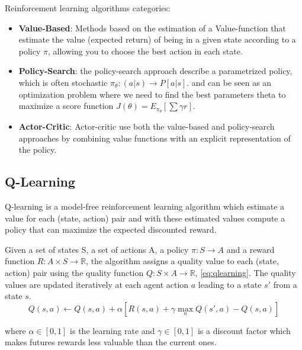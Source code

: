 \noindent
Reinforcement learning algorithms categories:
\begin{itemize}
    \item \textbf{Value-Based}: Methods based on the estimation of a Value-function that estimate the value (expected return) of being in a given state according to a policy $\pi$,
    allowing you to choose the best action in each state.

    \item \textbf{Policy-Search}: the policy-search approach describe a parametrized policy, which is often stochastic $\pi_{\theta} : (a | s) \rightarrow P[a | s]$.
    and can be seen as an optimization problem where we need to find the best parameters theta to maximize
    a score function $J(\theta) = E_{\pi_\theta}[\sum \gamma r]$.
    
    \item \textbf{Actor-Critic}: Actor-critic use both the value-based and policy-search approaches by combining value
    functions with an explicit representation of the policy.
\end{itemize}

\subsection{Q-Learning}
Q-learning \cite{watkins1992q} is a model-free reinforcement learning algorithm which estimate a value for each (state, action) pair
and with these estimated values compute a policy that can maximize the expected discounted reward.

Given a set of states S, a set of actions A, a policy $\pi : S \rightarrow A$ and a reward function $R : A \times S \rightarrow \mathbb{R}$, the algorithm assigns a quality value to each (state, action) pair using the quality function $Q : S \times A \rightarrow \mathbb{R}$, \cref{eq:qlearning}.
The quality values are updated iteratively at each agent action $a$ leading to a state $s'$ from a state $s$.
\begin{equation}
    Q(s, a) \leftarrow Q(s, a) + \alpha [R(s, a) + \gamma \max_a Q(s', a) - Q(s, a)]
    \label{eq:qlearning}
\end{equation}

where $\alpha \in [0, 1]$ is the learning rate and $\gamma \in [0, 1]$ is a discount factor which makes futures rewards less valuable than the current ones.


